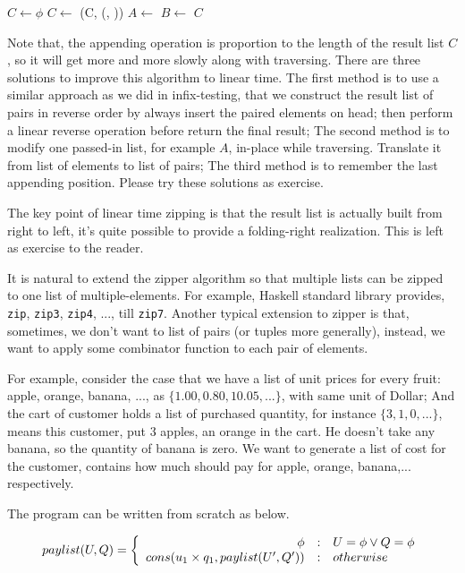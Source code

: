 \documentclass[b5paper]{article}
\begin{document}
\begin{algorithmic}[1]
  \State $C \gets \phi$
    \State $C \gets $ (C, (, ))
    \State $A \gets$ 
    \State $B \gets$ 
  \EndWhile
  \State \Return $C$
\EndFunction
\end{algorithmic}

Note that, the appending operation is proportion to the length of the result list $C$, so it will get
more and more slowly along with traversing. There are three solutions to improve this algorithm to
linear time. The first method is to use a similar approach as we did in infix-testing, that we construct
the result list of pairs in reverse order by always insert the paired elements on head; then perform
a linear reverse operation before return the final result; The second method is to modify one passed-in
list, for example $A$, in-place while traversing. Translate it from list of elements to list of pairs;
The third method is to remember the last appending position. Please try these solutions as exercise.

The key point of linear time zipping is that the result list is actually built from right to left, it's quite possible to provide a folding-right realization.
This is left as exercise to the reader.

It is natural to extend the zipper algorithm so that multiple lists can be zipped to one list of multiple-elements.
For example, Haskell standard library provides, \texttt{zip}, \texttt{zip3}, \texttt{zip4}, ..., till \texttt{zip7}.
Another typical extension to zipper is that, sometimes, we don't want to list of pairs (or tuples
more generally), instead, we want to apply some combinator function to each pair of elements.

For example, consider the case that we have a list of unit prices for every fruit: apple, orange, banana, ...,
 as $\{1.00, 0.80, 10.05, ...\}$, with same unit of Dollar; And the cart of customer holds a list
of purchased quantity, for instance $\{3, 1, 0, ...\}$, means this customer, put 3 apples, an orange in the
cart. He doesn't take any banana, so the quantity of banana is zero. We want to generate a list of cost for the
customer, contains how much should pay for apple, orange, banana,... respectively.

The program can be written from scratch as below.

\[
paylist(U, Q) =  \left \{
  \begin{array}
  {r@{\quad:\quad}l}
  \phi & U = \phi \lor Q = \phi \\
  cons(u_1 \times q_1, paylist(U', Q')) & otherwise
  \end{array}
\right.
\]
\end{document}

